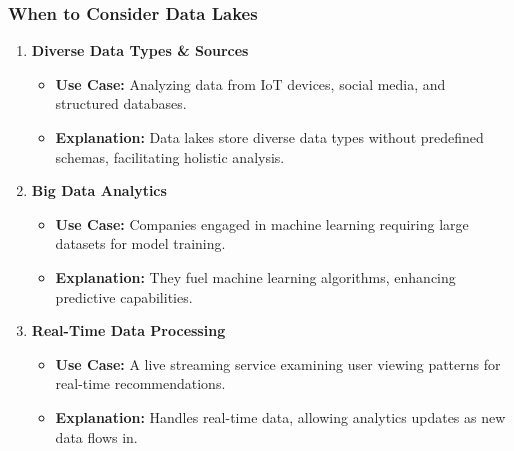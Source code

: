 \documentclass[aspectratio=169]{beamer}
\begin{document}
\begin{frame}[fragile]
    \frametitle{When to Consider Data Lakes}
    \begin{enumerate}
        \item \textbf{Diverse Data Types \& Sources}
            \begin{itemize}
                \item \textbf{Use Case:} Analyzing data from IoT devices, social media, and structured databases.
                \item \textbf{Explanation:} Data lakes store diverse data types without predefined schemas, facilitating holistic analysis.
            \end{itemize}
        \item \textbf{Big Data Analytics}
            \begin{itemize}
                \item \textbf{Use Case:} Companies engaged in machine learning requiring large datasets for model training.
                \item \textbf{Explanation:} They fuel machine learning algorithms, enhancing predictive capabilities.
            \end{itemize}
        \item \textbf{Real-Time Data Processing}
            \begin{itemize}
                \item \textbf{Use Case:} A live streaming service examining user viewing patterns for real-time recommendations.
                \item \textbf{Explanation:} Handles real-time data, allowing analytics updates as new data flows in.
            \end{itemize}
    \end{enumerate}
\end{frame}
\end{document}
